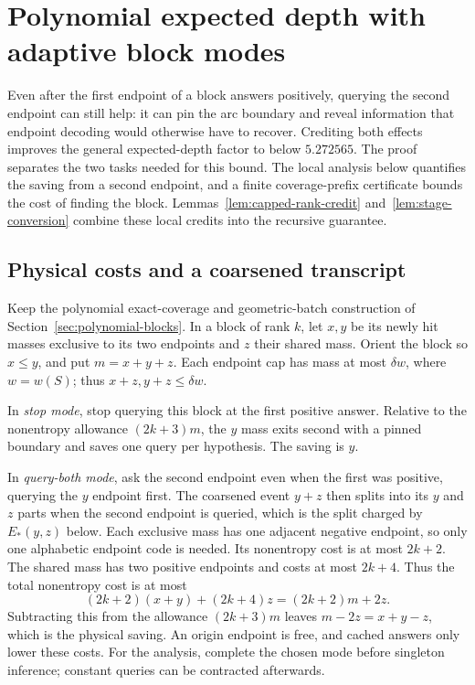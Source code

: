 \section{Polynomial expected depth with adaptive block modes}
\label{sec:adaptive-blocks}

Even after the first endpoint of a block answers positively, querying
the second endpoint can still help: it can pin the arc boundary and
reveal information that endpoint decoding would otherwise have to
recover. Crediting both effects improves the general expected-depth
factor to below $5.272565$. The proof separates the two tasks needed
for this bound. The local analysis below quantifies the saving from a
second endpoint, and a finite coverage-prefix certificate bounds the
cost of finding the block. Lemmas~\ref{lem:capped-rank-credit}
and~\ref{lem:stage-conversion} combine these local credits into the
recursive guarantee.

\subsection{Physical costs and a coarsened transcript}

Keep the polynomial exact-coverage and geometric-batch construction of
Section~\ref{sec:polynomial-blocks}. In a block of rank $k$, let $x,y$
be its newly hit masses exclusive to its two endpoints and $z$ their
shared mass. Orient the block so $x\le y$, and put $m=x+y+z$.
Each endpoint cap has mass at most $\delta w$, where $w=w(S)$;
thus $x+z,y+z\le\delta w$.

In \emph{stop mode}, stop querying this block at the first positive
answer. Relative to the nonentropy allowance $(2k+3)m$, the $y$ mass
exits second with a pinned boundary and saves one query per hypothesis.
The saving is $y$.

In \emph{query-both mode}, ask the second endpoint even when the first
was positive, querying the $y$ endpoint first. The coarsened event
$y+z$ then splits into its $y$ and $z$ parts when the second endpoint
is queried, which is the split charged by $E_*(y,z)$ below. Each
exclusive mass has one adjacent negative endpoint, so only one
alphabetic endpoint code is needed. Its nonentropy cost
is at most $2k+2$. The shared mass has two positive endpoints and
costs at most $2k+4$. Thus the total nonentropy cost is at most
\[
 (2k+2)(x+y)+(2k+4)z=(2k+2)m+2z.
\]
Subtracting this from the allowance $(2k+3)m$ leaves
$m-2z=x+y-z$, which is the physical saving.
An origin endpoint is free, and cached answers only lower these costs.
For the analysis, complete the chosen mode before singleton inference;
constant queries can be contracted afterwards.

